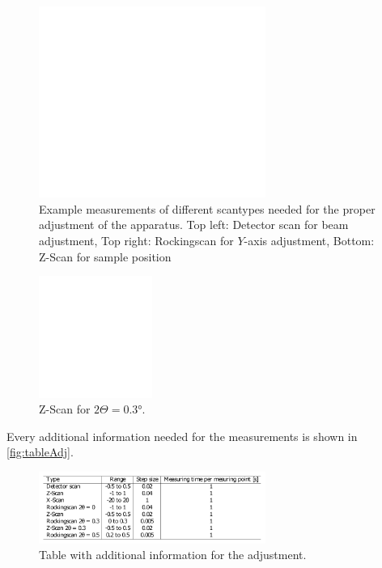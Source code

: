 \begin{figure}
	\centering
	\includegraphics[width=0.66\textwidth]{content/graphics/AdjustmentPlots.pdf}
	\caption{Example measurements of different scantypes needed for the proper adjustment of the apparatus. Top left: Detector scan for beam adjustment, Top right: Rockingscan for $Y$-axis adjustment, Bottom: Z-Scan for sample position }
	\label{fig:Adjustplot}
\end{figure}

\begin{figure}
	\centering
	\includegraphics[width=0.33\textwidth]{content/graphics/zscan.pdf}
	\caption{Z-Scan for $2\Theta = 0.3°$.}
	\label{fig:zscan}
\end{figure}

Every additional information needed for the measurements is shown in \autoref{fig:tableAdj}.
\begin{figure}
	\centering
	\includegraphics[width=0.66\textwidth]{content/graphics/table.pdf}
	\caption{Table with additional information for the adjustment.}
	\label{fig:tableAdj}
\end{figure}

